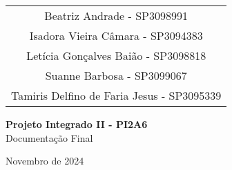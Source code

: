 \documentclass[
    12pt,               %
    openright,          %
    oneside,
    a4paper,            %
    hyphens,
    paginasA3,  %
    GLOSSARIO, %
    TODO, %
    english,            %
    brazil           %
    ]{regras-pi1a5} %
\begin{document}
\begin{titlepage}
    \begin{center}
        \vspace*{1cm}
        
        \begin{tabular}{c}
            {\large Beatriz Andrade - SP3098991} \\
            {\large Isadora Vieira Câmara - SP3094383} \\
            {\large Letícia Gonçalves Baião - SP3098818} \\
            {\large Suanne Barbosa - SP3099067} \\
            {\large Tamiris Delfino de Faria Jesus - SP3095339} \\
        \end{tabular}
        
        \vspace{6cm}
        
        \textbf{\LARGE{Projeto Integrado II - PI2A6}}\\
        \vspace{0.2cm}
        {\large{Documentação Final}}
    
        \vfill
        
        \large{Novembro de 2024}
        
    \end{center}
\end{titlepage}





\renewcommand{\vhhistoryname}{Histórico de Revisões}
\renewcommand{\vhversionname}{Revisão}
\renewcommand{\vhdatename}{Data}
\renewcommand{\vhauthorname}{Autores}
\renewcommand{\vhchangename}{Descrição}

\begin{versionhistory}



\end{versionhistory}
\end{document}
